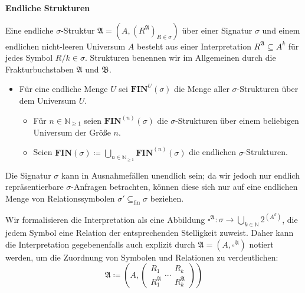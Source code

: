 \begin{defn}
\textbf{Endliche Strukturen}

Eine endliche $\sigma$-Struktur $\mathfrak{A}=\left(A,\left(R^{\mathfrak{A}}\right)_{R\in\sigma}\right)$
über einer Signatur $\sigma$ und einem endlichen nicht-leeren Universum
$A$ besteht aus einer Interpretation $R^{\mathfrak{A}}\subseteq A^{k}$
für jedes Symbol $R/k\in\sigma$. Strukturen benennen wir im Allgemeinen
durch die Frakturbuchstaben $\mathfrak{A}$ und $\mathfrak{B}$.

\end{defn}
\begin{itemize}
\item Für eine endliche Menge $U$ sei $\mathbf{FIN}^{U}\left(\sigma\right)$
die Menge aller $\sigma$-Strukturen über dem Universum $U$.
\begin{itemize}
\item Für $n\in\mathbb{N}_{\geqslant1}$ seien $\mathbf{FIN}^{\left(n\right)}\left(\sigma\right)$
die $\sigma$-Strukturen über einem beliebigen Universum der Größe
$n$.
\item Seien $\mathbf{FIN}\left(\sigma\right)\coloneqq\bigcup_{n\in\mathbb{N}_{\geqslant1}}\mathbf{FIN}^{\left(n\right)}\left(\sigma\right)$
die endlichen $\sigma$-Strukturen.
\end{itemize}
\end{itemize}
Die Signatur $\sigma$ kann in Ausnahmefällen unendlich sein; da wir
jedoch nur endlich repräsentierbare $\sigma$-Anfragen betrachten,
können diese sich nur auf eine endlichen Menge von Relationssymbolen
$\sigma'\subseteq_{\mathrm{fin}}\sigma$ beziehen.

Wir formalisieren die Interpretation als eine Abbildung $\square^{\mathfrak{A}}:\sigma\rightarrow\bigcup_{k\in\mathbb{N}}2^{\left(A^{k}\right)}$,
die jedem Symbol eine Relation der entsprechenden Stelligkeit zuweist.
Daher kann die Interpretation gegebenenfalls auch explizit durch $\mathfrak{A}=\left(A,\square^{\mathfrak{A}}\right)$
notiert werden, um die Zuordnung von Symbolen und Relationen zu verdeutlichen:
\[
\mathfrak{A}\coloneqq\left(A,\left(\begin{array}{c}
R_{1}\\
R_{1}^{\mathfrak{A}}
\end{array}\cdots\begin{array}{c}
R_{k}\\
R_{k}^{\mathfrak{A}}
\end{array}\right)\right)
\]

